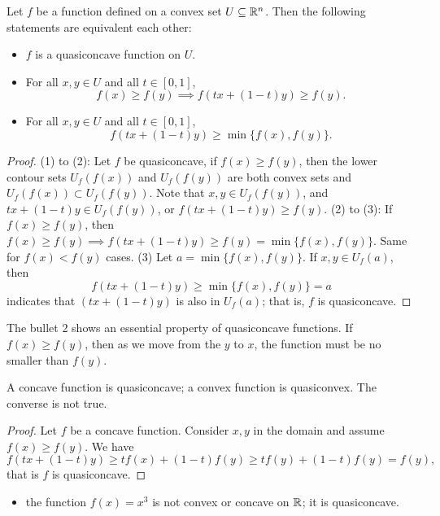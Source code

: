 \begin{refsection}
\begin{lemma}\cite[523]{simon1994mathematics}
	Let $f$ be a function defined on a convex set $U\subseteq \mathbb{R}^n$. Then the following statements are equivalent each other:
	\begin{itemize}
		\item $f$ is a quasiconcave function on $U$.
		\item For all $x,y \in U$ and all $t \in [0,1]$, 
		$$f(x)\geq f(y) \implies f(tx + (1-t)y) \geq f(y).$$
		\item For all $x,y \in U$ and all $t \in [0,1]$, 
		$$ f(tx + (1-t)y) \geq \min\{f(x), f(y)\}.$$
	\end{itemize}
\end{lemma}
\begin{proof}
	(1) to (2): Let $f$ be quasiconcave, if $f(x) \geq f(y)$, then the lower contour sets $U_f(f(x))$ and $U_f(f(y))$ are both convex sets and $U_f(f(x)) \subset U_f(f(y))$. Note that $x,y \in U_f(f(y))$, and $tx + (1-t)y \in U_f(f(y))$, or $f(tx + (1-t)y) \geq f(y) $.
	(2) to (3): If $f(x)\geq f(y)$, then $f(x)\geq f(y) \implies f(tx + (1-t)y) \geq f(y) = \min\{f(x), f(y)\}$. Same for $f(x) < f(y)$ cases. (3)	Let $a = \min\{f(x),f(y)\}$. If $x,y \in U_f(a)$, then $$f(tx + (1-t)y) \geq \min\{f(x), f(y)\} = a$$
	indicates that $(tx + (1-t)y)$ is also in $U_f(a)$; that is, $f$ is quasiconcave.
\end{proof}

\begin{note}
	The bullet 2 shows an essential property of quasiconcave functions. If $f(x) \geq f(y)$, then as we move from the $y$ to $x$, the function must be no smaller than $f(y)$.  
\end{note}

\begin{lemma}
	A concave function is quasiconcave; a convex function is quasiconvex. The converse is not true.
\end{lemma}
\begin{proof}
	Let $f$ be a concave function. Consider $x,y$ in the domain and assume $f(x)\geq f(y)$. We have
	$$f(tx + (1-t)y) \geq tf(x) + (1-t)f(y) \geq tf(y) + (1-t)f(y) = f(y),$$
	that is $f$ is quasiconcave.	
\end{proof}

\begin{example}\hfill
	\begin{itemize}
		\item the function $f(x) = x^3$ is not convex or concave on $\mathbb{R}$; it is quasiconcave.
	\end{itemize}
	

\end{example}
\end{refsection}
